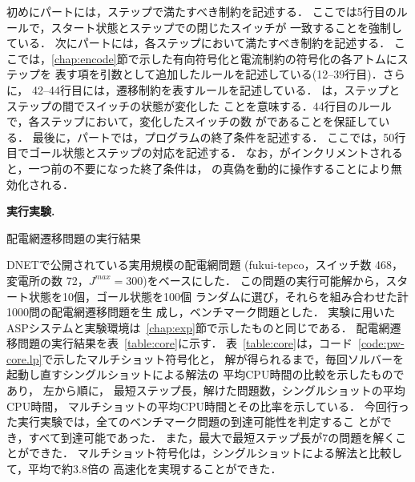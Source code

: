 初めにパートには，ステップで満たすべき制約を記述する．
ここでは5行目のルールで，スタート状態とステップでの閉じたスイッチが
一致することを強制している．
%
次にパートには，各ステップにおいて満たすべき制約を記述する．
ここでは，\ref{chap:encode}節で示した有向符号化と電流制約の符号化の各アトムにステップを
表す項を引数として追加したルールを記述している(12--39行目)．さらに，
42--44行目には，遷移制約を表すルールを記述している．
は，ステップとステップの間でスイッチの状態が変化した
ことを意味する．44行目のルールで，各ステップにおいて，変化したスイッチの数
がであることを保証している．
%
最後に，パートでは，プログラムの終了条件を記述する．
ここでは，50行目でゴール状態とステップの対応を記述する．
なお，がインクリメントされると，一つ前の不要になった終了条件は，
の真偽を動的に操作することにより無効化される．

\textbf{実行実験.}
\begin{table*}[t]
  \centering
  \caption{配電網遷移問題の実行結果}
  \label{table:core}
  
\end{table*}
%
DNETで公開されている実用規模の配電網問題
({\sf fukui-tepco}，スイッチ数 468，変電所の数 72，$J^{max}=300$)をベースにした．
この問題の実行可能解から，スタート状態を10個，ゴール状態を100個
ランダムに選び，それらを組み合わせた計1000問の配電網遷移問題を生
成し，ベンチマーク問題とした．
実験に用いたASPシステムと実験環境は~\ref{chap:exp}節で示したものと同じである．
配電網遷移問題の実行結果を表~\ref{table:core}に示す．
表~\ref{table:core}は，コード~\ref{code:pw-core.lp}で示したマルチショット符号化と，
解が得られるまで，毎回ソルバーを起動し直すシングルショットによる解法の
平均CPU時間の比較を示したものであり，
左から順に，
最短ステップ長，解けた問題数，シングルショットの平均CPU時間，
マルチショットの平均CPU時間とその比率を示している．
今回行った実行実験では，全てのベンチマーク問題の到達可能性を判定するこ
とができ，すべて到達可能であった．
また，最大で最短ステップ長が7の問題を解くことができた．
マルチショット符号化は，シングルショットによる解法と比較して，平均で約3.8倍の
高速化を実現することができた．



